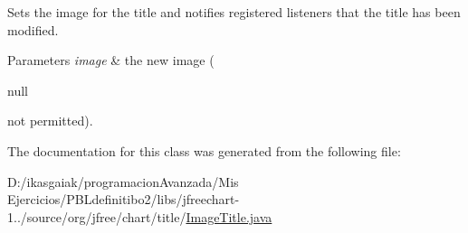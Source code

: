 Sets the image for the title and notifies registered listeners that the title has been modified.


\begin{DoxyParams}{Parameters}
{\em image} & the new image (
\begin{DoxyCode}
null 
\end{DoxyCode}
 not permitted). \\
\hline
\end{DoxyParams}


The documentation for this class was generated from the following file\+:\begin{DoxyCompactItemize}
\item 
D\+:/ikasgaiak/programacion\+Avanzada/\+Mis Ejercicios/\+P\+B\+Ldefinitibo2/libs/jfreechart-\/1../source/org/jfree/chart/title/\mbox{\hyperlink{_image_title_8java}{Image\+Title.\+java}}\end{DoxyCompactItemize}
